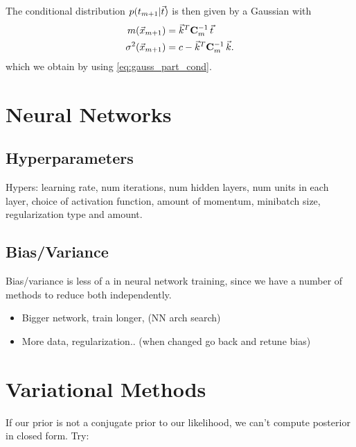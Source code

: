 \documentclass[11pt]{article}
\begin{document}
The conditional distribution $p(t_{m+1} | \vec{t})$ is then given by a Gaussian with
\begin{align}
  m(\vec{x}_{m+1})         &= \vec{k}^T \mathbf{C}_m^{-1}\, \vec{t}\\
  \sigma^2 (\vec{x}_{m+1}) &= c - \vec{k}^T \mathbf{C}_m^{-1}\, \vec{k}.
\end{align}
which we obtain by using \ref{eq:gauss_part_cond}.




\section{Neural Networks}
\label{sec:nn}

\subsection{Hyperparameters}
Hypers: learning rate, num iterations, num hidden layers, num units in each layer,
choice of activation function, amount of momentum, minibatch size, regularization type
and amount.

\subsection{Bias/Variance}

Bias/variance is less of a  in neural network training, since we have a
number of methods to reduce both independently.
\begin{itemize}
  \item {} Bigger network, train longer, (NN arch
  search)
  \item {} More data, regularization.. (when changed
  go back and retune bias)
\end{itemize}


\section{Variational Methods}
\label{sec:var_meth}

If our prior is not a conjugate prior to our likelihood, we can't compute posterior in
closed form. Try:
\end{document}
